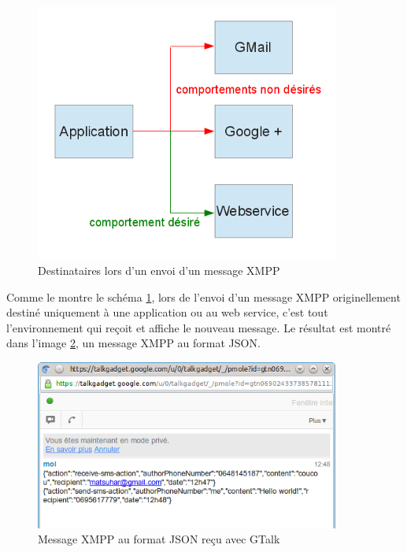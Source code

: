 \begin{figure}[!h]
	\center
	\includegraphics[width=10cm]{img/broadcast-xmpp.png}
	\caption{Destinataires lors d'un envoi d'un message XMPP}
	\label{broadcast-xmpp}
\end{figure}

Comme le montre le schéma \ref{broadcast-xmpp}, lors de l'envoi d'un message XMPP originellement destiné uniquement à une application ou au web service, c'est tout l'environnement qui reçoit et affiche le nouveau message.
Le résultat est montré dans l'image \ref{message-xmpp-json-gmail}, un message XMPP au format JSON. 
	
\begin{figure}[!h]
	\center
	\includegraphics[width=10cm]{img/message-xmpp-json-gmail.png}
	\caption{Message XMPP au format JSON reçu avec GTalk}
	\label{message-xmpp-json-gmail}
\end{figure}







